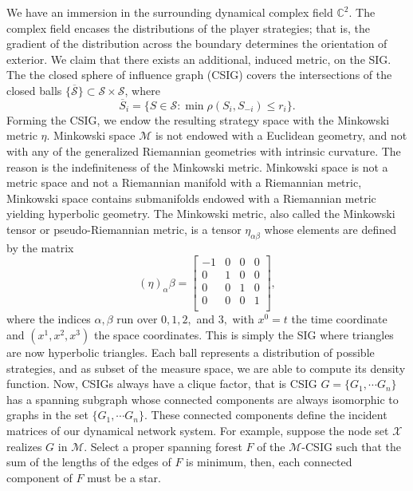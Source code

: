 \documentclass[10pt]{article}
\newcommand{\mcM}{\mathcal{M}}
\newcommand{\mcX}{\mathcal{X}}
\newcommand{\mcS}{\mathcal{S}}
\theoremstyle{definition}
\begin{document}
We have an immersion in the surrounding
dynamical complex field $\mathbb{C}^2$. The complex field encases the distributions of the
player strategies; that is, the gradient of the distribution across the boundary
determines the orientation of exterior.
We claim that there exists an additional, induced metric, on the
SIG. The the closed sphere of influence graph (CSIG) covers the intersections
of the closed balls $\lbrace\overline{\mcS}\rbrace \subset \mcS\times \mcS$, where
$$
    \overline{S}_i= \lbrace S \in \mcS : \min\rho(S_i, S_{-i}) \le r_i\rbrace.
$$
Forming the CSIG,
we endow the resulting strategy space with the Minkowski metric $\eta$.
Minkowski space $\mcM$ is not endowed with a Euclidean geometry, and not with any of the generalized Riemannian geometries with intrinsic curvature. The reason is the indefiniteness of the Minkowski metric. Minkowski space is not a metric space and not a Riemannian manifold with a Riemannian metric, Minkowski space contains submanifolds endowed with a Riemannian metric yielding hyperbolic geometry. The Minkowski metric, also called the Minkowski tensor or pseudo-Riemannian metric, is a tensor $\eta_{\alpha\beta}$ whose elements are defined by the matrix
$$
	(\eta)_\alpha\beta = \begin{bmatrix}
		-1 & 0 & 0 & 0 \\
		0 & 1 & 0 & 0 \\
		0 & 0 & 1 & 0 \\
		0 & 0 & 0 & 1 \\
	\end{bmatrix},
$$
where the indices $\alpha,\beta$ run over $0, 1, 2,$ and $3,$ with $x^0=t$ the time coordinate and $(x^1,x^2,x^3)$ the space coordinates. This is simply the SIG where triangles are now hyperbolic triangles. 
Each ball represents a distribution of possible strategies, and as subset of the
measure space, we are able to compute its density function. 
Now, CSIGs always have a clique factor, that is CSIG $G = \lbrace G_1,\cdots G_n\rbrace$ has a spanning subgraph whose connected components are always isomorphic to graphs in the set $\lbrace G_1,\cdots G_n\rbrace$. These connected components define the incident matrices of our dynamical network system. For example, suppose the node set $\mcX$ realizes $G$ in $\mcM$. Select a proper spanning forest $F$
of the $\mcM$-CSIG such that the sum of the lengths of the edges of $F$ is minimum, then, each connected component of $F$ must be a star.
\end{document}
